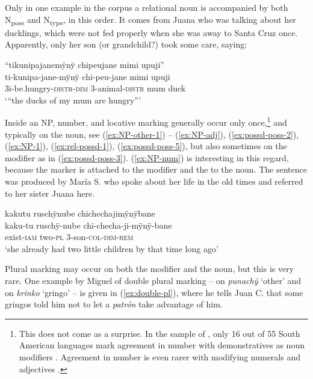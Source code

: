 {Only in one example in the corpus a relational noun is accompanied by both N\textsubscript{poss} and N\textsubscript{type}, in this order. It comes from Juana who was talking about her ducklings, which were not fed properly when she was away to Santa Cruz once. Apparently, only her son (or grandchild?) took some care, saying: 

\ea\label{ex:possd-poss-5}
\begingl
\glpreamble “tikunipajanemÿnÿ chipeujane mimi upuji”\\
\gla ti-kunipa-jane-mÿnÿ chi-peu-jane mimi upuji\\
\glb 3i-be.hungry-\textsc{distr}-\textsc{dim} 3-animal-\textsc{distr} mum duck\\
\glft ‘“the ducks of my mum are hungry”’
\endgl
{}
\xe
{}

Inside an NP, number,  and locative marking generally occur only once,\footnote{This does not come as a surprise. In the sample of \citet[]{Krasnoukhova2012}, only 16 out of 55 South American languages mark agreement in number with demonstratives as noun modifiers \citep[52]{Krasnoukhova2012}. Agreement in number is even rarer with modifying numerals and adjectives \citep[126, 163–164]{Krasnoukhova2012}.} and typically on the  noun, see (\ref{ex:NP-other-1}) – (\ref{ex:NP-adj}), (\ref{ex:possd-poss-2}), (\ref{ex:NP-1}), (\ref{ex:rel-possd-1}), (\ref{ex:possd-poss-5}), but also sometimes on the modifier as in (\ref{ex:possd-poss-3}). (\ref{ex:NP-num}) is interesting in this regard, because the  marker is attached to the modifier and the  to the  noun. The sentence was produced by María S. who spoke about her life in the old times and referred to her sister Juana here.

\ea\label{ex:NP-num}
\begingl
\glpreamble kakutu ruschÿnube chichechajimÿnÿbane\\
\gla kaku-tu ruschÿ-nube chi-checha-ji-mÿnÿ-bane\\
\glb exist-\textsc{iam} two-\textsc{pl} 3-son-\textsc{col}-\textsc{dim}-\textsc{rem}\\
\glft ‘she already had two little children by that time long ago’
\endgl
\trailingcitation{[rxx-p181101l-2.107]}
\xe

Plural marking may occur on both the modifier and the noun, but this is very rare. One example by Miguel of double plural marking – on \textit{punachÿ} ‘other’ and on \textit{krinko} ‘gringo’ – is given in (\ref{ex:double-pl}), where he tells Juan C. that some gringos told him not to let a \textit{patrón} take advantage of him.

}
